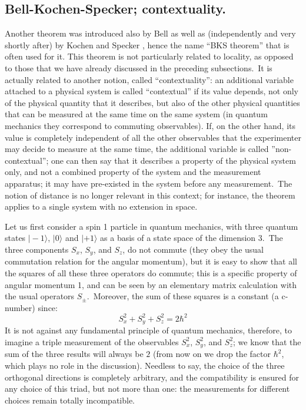 \documentclass[12pt,onecolumn]{article}%
\begin{document}
\subsection{Bell-Kochen-Specker; contextuality.}

\label{BKS}

Another theorem was introduced also by Bell \cite{Bell-1} as well as
(independently and very shortly after) by Kochen and Specker
\cite{Kochen-Specker}, hence the name ``BKS theorem'' that is often used for
it. This theorem is not particularly related to locality, as opposed to those
that we have already discussed in the preceding subsections.\ It is actually
related to another notion, called ``contextuality'': an additional variable
attached to a physical system is called ``contextual'' if its value depends,
not only of the physical quantity that it describes, but also of the other
physical quantities that can be measured at the same time on the same system
(in quantum mechanics they correspond to commuting observables). If, on the
other hand, its value is completely independent of all the other observables
that the experimenter may decide to measure at the same time, the additional
variable is called ''non-contextual''; one can then say that it describes a
property of the physical system only, and not a combined property of the
system and the measurement apparatus; it may have pre-existed in the system
before any measurement.\ The notion of distance is no longer relevant in this
context; for instance, the theorem applies to a single system with no
extension in space.

Let us first consider a spin 1 particle in quantum mechanics, with three
quantum states $|\!-1\rangle$, $|0\rangle$ and $|+1\rangle$ as a basis of a state space of
the dimension 3.\ The three components $S_{x}$, $S_{y}$, and $S_{z}$, do not
commute (they obey the usual commutation relation for the angular momentum),
but it is easy to show that all the squares of all these three operators do
commute; this is a specific property of angular momentum 1, and can be seen by
an elementary matrix calculation with the usual operators $S_{\pm}%
$.\ Moreover, the sum of these squares is a constant (a c-number) since:%
\begin{equation}
S_{x}^{2}+S_{y}^{2}+S_{z}^{2}=2\hbar^{2} \label{12}%
\end{equation}
It is not against any fundamental principle of quantum mechanics, therefore,
to imagine a triple measurement of the observables $S_{x}^{2}$, $S_{y}^{2}$,
and $S_{z}^{2}$; we know that the sum of the three results will always be $2$
(from now on we drop the factor $\hbar^{2}$, which plays no role in the
discussion). Needless to say, the choice of the three orthogonal directions is
completely arbitrary, and the compatibility is ensured for any choice of this
triad, but not more than one: the measurements for different choices remain
totally incompatible.
\end{document}
